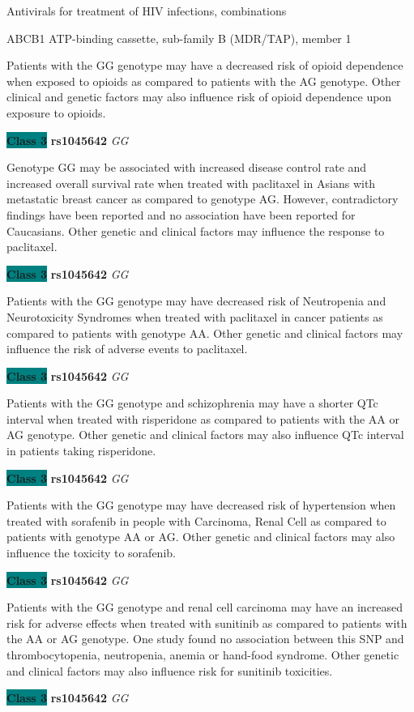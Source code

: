 \documentclass{resume} %
\begin{document}
\begin{rSection}{ Antivirals for treatment of HIV infections, combinations }
\begin{rSubsection}{ ABCB1 }{ ATP-binding cassette, sub-family B (MDR/TAP), member 1 }{}{}
\item[] Patients with the GG genotype may have a decreased risk of opioid dependence when exposed to opioids as compared to patients with the AG genotype. Other clinical and genetic factors may also influence risk of opioid dependence upon exposure to opioids. \item \textbf{\colorbox{teal} {Class 3}} \textbf{ rs1045642 } \textit{ GG }
\item[] Genotype GG may be associated with increased disease control rate and increased overall survival rate when treated with paclitaxel in Asians with metastatic breast cancer as compared to genotype AG. However, contradictory findings have been reported and no association have been reported for Caucasians. Other genetic and clinical factors may influence the response to paclitaxel.\item \textbf{\colorbox{teal} {Class 3}} \textbf{ rs1045642 } \textit{ GG }
\item[] Patients with the GG genotype may have decreased risk of Neutropenia and Neurotoxicity Syndromes when treated with paclitaxel in cancer patients as compared to patients with genotype AA. Other genetic and clinical factors may influence the risk of adverse events to paclitaxel.\item \textbf{\colorbox{teal} {Class 3}} \textbf{ rs1045642 } \textit{ GG }
\item[] Patients with the GG genotype and schizophrenia may have a shorter QTc interval when treated with risperidone as compared to patients with the AA or AG genotype. Other genetic and clinical factors may also influence QTc interval in patients taking risperidone.\item \textbf{\colorbox{teal} {Class 3}} \textbf{ rs1045642 } \textit{ GG }
\item[] Patients with the GG genotype may have decreased risk of hypertension when treated with sorafenib in people with Carcinoma, Renal Cell as compared to patients with genotype AA or AG. Other genetic and clinical factors may also influence the toxicity to sorafenib.\item \textbf{\colorbox{teal} {Class 3}} \textbf{ rs1045642 } \textit{ GG }
\item[] Patients with the GG genotype and renal cell carcinoma may have an increased risk for adverse effects when treated with sunitinib as compared to patients with the AA or AG genotype. One study found no association between this SNP and thrombocytopenia, neutropenia, anemia or hand-food syndrome. Other genetic and clinical factors may also influence risk for sunitinib toxicities.\item \textbf{\colorbox{teal} {Class 3}} \textbf{ rs1045642 } \textit{ GG }

\end{rSubsection}
\end{rSection}
\end{document}
